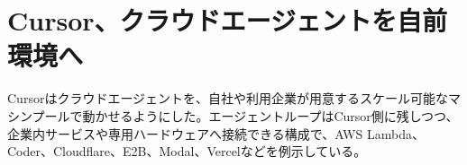 \section{Cursor、クラウドエージェントを自前環境へ}
Cursorはクラウドエージェントを、自社や利用企業が用意するスケール可能なマシンプールで動かせるようにした。エージェントループはCursor側に残しつつ、企業内サービスや専用ハードウェアへ接続できる構成で、AWS Lambda、Coder、Cloudflare、E2B、Modal、Vercelなどを例示している。
